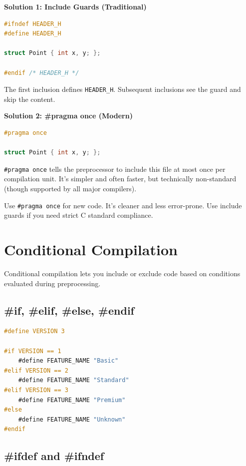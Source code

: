 \textbf{Solution 1: Include Guards (Traditional)}

\begin{lstlisting}[language=C]
#ifndef HEADER_H
#define HEADER_H

struct Point { int x, y; };

#endif /* HEADER_H */
\end{lstlisting}

The first inclusion defines \texttt{HEADER\_H}. Subsequent inclusions see the guard and skip the content.

\textbf{Solution 2: \#pragma once (Modern)}

\begin{lstlisting}[language=C]
#pragma once

struct Point { int x, y; };
\end{lstlisting}

\texttt{\#pragma once} tells the preprocessor to include this file at most once per compilation unit. It's simpler and often faster, but technically non-standard (though supported by all major compilers).

\begin{recommendation}
Use \texttt{\#pragma once} for new code. It's cleaner and less error-prone. Use include guards if you need strict C standard compliance.
\end{recommendation}

\section{Conditional Compilation}

Conditional compilation lets you include or exclude code based on conditions evaluated during preprocessing.

\subsection{\#if, \#elif, \#else, \#endif}

\begin{lstlisting}[language=C]
#define VERSION 3

#if VERSION == 1
    #define FEATURE_NAME "Basic"
#elif VERSION == 2
    #define FEATURE_NAME "Standard"
#elif VERSION == 3
    #define FEATURE_NAME "Premium"
#else
    #define FEATURE_NAME "Unknown"
#endif
\end{lstlisting}

\subsection{\#ifdef and \#ifndef}


